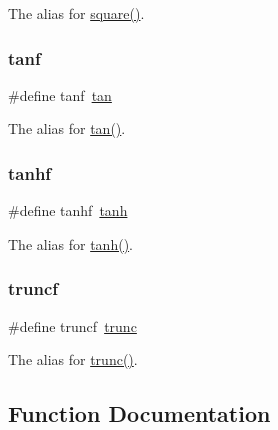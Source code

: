 The alias for \hyperlink{group__avr__math_gabb95d8256ff81d58f092c065ea204293}{square()}. \mbox{\label{group__avr__math_ga841e8ff746ff8b099a00ee83d2eed1d7}} 
\subsubsection{\texorpdfstring{tanf}{tanf}}
{\footnotesize\ttfamily \#define tanf~\hyperlink{group__avr__math_ga3aa121cf8eee9dc1647c0b83ebbd72e9}{tan}}

The alias for \hyperlink{group__avr__math_ga3aa121cf8eee9dc1647c0b83ebbd72e9}{tan()}. \mbox{\label{group__avr__math_gae1308938bb768033031c381d148ad8f1}} 
\subsubsection{\texorpdfstring{tanhf}{tanhf}}
{\footnotesize\ttfamily \#define tanhf~\hyperlink{group__avr__math_ga97f0f3ecd653766bd1a94910cb0cad9f}{tanh}}

The alias for \hyperlink{group__avr__math_ga97f0f3ecd653766bd1a94910cb0cad9f}{tanh()}. \mbox{\label{group__avr__math_ga329f9e84df43e59c5999e661aeab14ec}} 
\subsubsection{\texorpdfstring{truncf}{truncf}}
{\footnotesize\ttfamily \#define truncf~\hyperlink{group__avr__math_ga63f7d01fc9b6a91bca4f71089213ea42}{trunc}}

The alias for \hyperlink{group__avr__math_ga63f7d01fc9b6a91bca4f71089213ea42}{trunc()}. 

\subsection{Function Documentation}
\mbox{\label{group__avr__math_gaa3a144378cb5470be25699ce14b5998b}} 
